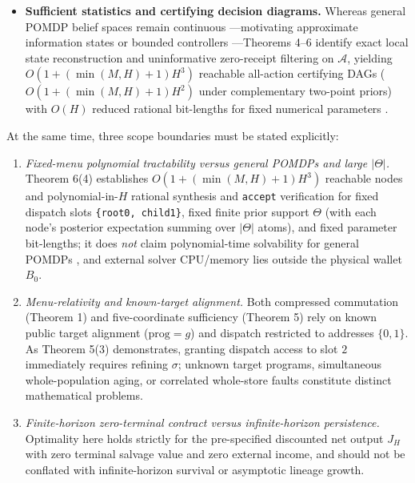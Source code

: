 \documentclass[11pt,a4paper]{article}
\providecommand{\tightlist}{\setlength{\itemsep}{2pt}\setlength{\parskip}{0pt}}
\begin{document}
\begin{itemize}
  premium (\(d\,\mathrm{Var}(r_\theta)\)), and strictly positive
  post-repair \emph{device-state} feedback
  (\(d^3\mathbb{E}[r_\theta^3(1-r_\theta)]\)) inside the exact subgame
  where \emph{parameter} revelation is worthless
  (\(\mathrm{EVPI}_{\mathrm{post}} = 0\)).
\item
  \textbf{Sufficient statistics and certifying decision diagrams.}
  Whereas general POMDP belief spaces remain continuous
  \citep{smallwoodSondik1973, sondik1978, lovejoy1991, kaelbling1998}---motivating
  approximate information states \citep{subramanian2022} or bounded
  controllers \citep{hansen1998, poupartBoutilier2003}---Theorems 4--6
  identify exact local state reconstruction and uninformative
  zero-receipt filtering on \(\mathcal{A}\), yielding
  \(O(1 + (\min(M, H) + 1)H^3)\) reachable all-action certifying DAGs
  (\(O(1 + (\min(M, H) + 1)H^2)\) under complementary two-point priors)
  with \(O(H)\) reduced rational bit-lengths for fixed numerical
  parameters
  \citep{bryant1986, bahar1997, hoey1999, bergman2016, mcconnell2011}.
\end{itemize}

At the same time, three scope boundaries must be stated explicitly:

\begin{enumerate}
\def\labelenumi{\arabic{enumi}.}
\tightlist
\item
  \emph{Fixed-menu polynomial tractability versus general POMDPs and
  large \(|\Theta|\).} Theorem 6(4) establishes
  \(O(1 + (\min(M, H) + 1)H^3)\) reachable nodes and polynomial-in-\(H\)
  rational synthesis and \texttt{accept} verification for fixed dispatch
  slots \texttt{\{root0,\ child1\}}, fixed finite prior support
  \(\Theta\) (with each node's posterior expectation summing over
  \(|\Theta|\) atoms), and fixed parameter bit-lengths; it does
  \emph{not} claim polynomial-time solvability for general POMDPs
  \citep{papadimitriouTsitsiklis1987, madani2003}, and external solver
  CPU/memory lies outside the physical wallet \(B_0\).
\item
  \emph{Menu-relativity and known-target alignment.} Both compressed
  commutation (Theorem 1) and five-coordinate sufficiency (Theorem 5)
  rely on known public target alignment (\(\mathrm{prog} = g\)) and
  dispatch restricted to addresses \(\{0, 1\}\). As Theorem 5(3)
  demonstrates, granting dispatch access to slot \(2\) immediately
  requires refining \(\sigma\); unknown target programs, simultaneous
  whole-population aging, or correlated whole-store faults constitute
  distinct mathematical problems.
\item
  \emph{Finite-horizon zero-terminal contract versus infinite-horizon
  persistence.} Optimality here holds strictly for the pre-specified
  discounted net output \(J_H\) with zero terminal salvage value and
  zero external income, and should not be conflated with
  infinite-horizon survival or asymptotic lineage growth.
\end{enumerate}
\end{document}
